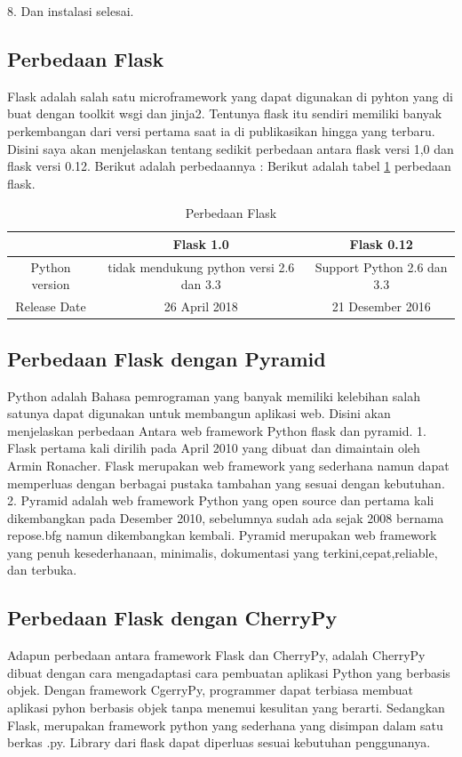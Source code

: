 \documentclass[12pt,a4paper]{article}
\begin{document}
8.	Dan instalasi selesai.

\subsection{Perbedaan Flask}
\hspace{1cm} Flask adalah salah satu microframework yang dapat digunakan di pyhton yang di buat dengan toolkit wsgi dan jinja2. Tentunya flask itu sendiri memiliki banyak perkembangan dari versi pertama saat ia di publikasikan hingga yang terbaru. Disini saya akan menjelaskan tentang sedikit perbedaan antara flask versi 1,0 dan flask versi 0.12. Berikut adalah perbedaannya :
Berikut adalah tabel \ref{table:perbedaan} perbedaan flask.
\begin{table}[h]
\caption{Perbedaan Flask}

\centering
\begin{tabular}{ccc}
\hline
&Flask 1.0&Flask 0.12\\
\hline
Python version&tidak mendukung python versi 2.6 dan 3.3&Support Python 2.6 dan 3.3\\
\hline
Release Date&26 April 2018&21 Desember 2016\\
\hline
\end{tabular}
\label{table:perbedaan}
\end{table}

\subsection{Perbedaan Flask dengan Pyramid}
Python adalah Bahasa pemrograman yang banyak memiliki kelebihan salah satunya dapat digunakan untuk membangun aplikasi web. Disini akan menjelaskan perbedaan Antara web framework Python flask dan pyramid.
1.	Flask pertama kali dirilih pada April 2010 yang dibuat dan dimaintain oleh Armin Ronacher. Flask merupakan web framework yang sederhana namun dapat memperluas dengan berbagai pustaka tambahan yang sesuai dengan kebutuhan.
2.	Pyramid adalah web framework Python yang open source dan pertama kali dikembangkan pada Desember 2010, sebelumnya sudah ada sejak 2008 bernama repose.bfg namun dikembangkan kembali. Pyramid merupakan web framework yang penuh kesederhanaan, minimalis, dokumentasi yang terkini,cepat,reliable, dan terbuka.
\subsection{Perbedaan Flask dengan CherryPy}
Adapun perbedaan antara framework Flask dan CherryPy, adalah CherryPy dibuat dengan cara mengadaptasi cara pembuatan aplikasi Python yang berbasis objek. Dengan framework CgerryPy, programmer dapat terbiasa membuat aplikasi pyhon berbasis objek tanpa menemui kesulitan yang berarti. Sedangkan Flask, merupakan framework python yang sederhana yang disimpan dalam satu berkas .py. Library dari flask dapat diperluas sesuai kebutuhan penggunanya.
\end{document}

